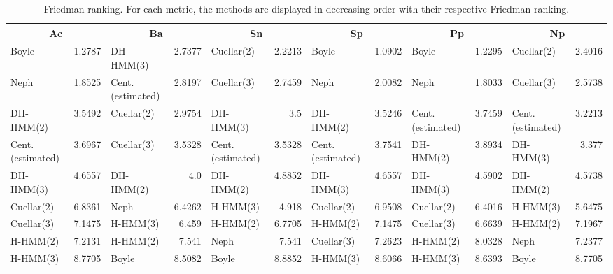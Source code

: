\documentclass[landscape, 8pt]{report}
\begin{document}
\begin{table}[h!]
\label{tab:ranking}
\vspace{0.0cm}
\begin{center}
\caption{Friedman ranking. For each metric, the methods are displayed in decreasing order with their respective Friedman ranking.}
\renewcommand{\arraystretch}{1.2}
  \begin{tabular}{ |lr|lr|lr|lr|lr|lr| }
    \hline
    \multicolumn{2}{|c|}{\textbf{Ac}} & \multicolumn{2}{|c|}{\textbf{Ba}} & \multicolumn{2}{|c|}{\textbf{Sn}} & \multicolumn{2}{|c|}{\textbf{Sp}} & \multicolumn{2}{|c|}{\textbf{Pp}} & \multicolumn{2}{|c|}{\textbf{Np}} \\
    \hline
    Boyle & 1.2787 &     DH-HMM(3) & 2.7377 &     Cuellar(2) & 2.2213 &     Boyle & 1.0902 &     Boyle & 1.2295 &     Cuellar(2) & 2.4016 \\
    Neph & 1.8525 &     Cent.(estimated) & 2.8197 &     Cuellar(3) & 2.7459 &     Neph & 2.0082 &     Neph & 1.8033 &     Cuellar(3) & 2.5738 \\
    DH-HMM(2) & 3.5492 &     Cuellar(2) & 2.9754 &     DH-HMM(3) & 3.5 &     DH-HMM(2) & 3.5246 &     Cent.(estimated) & 3.7459 &     Cent.(estimated) & 3.2213 \\
    Cent.(estimated) & 3.6967 &     Cuellar(3) & 3.5328 &     Cent.(estimated) & 3.5328 &     Cent.(estimated) & 3.7541 &     DH-HMM(2) & 3.8934 &     DH-HMM(3) & 3.377 \\
    DH-HMM(3) & 4.6557 &     DH-HMM(2) & 4.0 &     DH-HMM(2) & 4.8852 &     DH-HMM(3) & 4.6557 &     DH-HMM(3) & 4.5902 &     DH-HMM(2) & 4.5738 \\
    Cuellar(2) & 6.8361 &     Neph & 6.4262 &     H-HMM(3) & 4.918 &     Cuellar(2) & 6.9508 &     Cuellar(2) & 6.4016 &     H-HMM(3) & 5.6475 \\
    Cuellar(3) & 7.1475 &     H-HMM(3) & 6.459 &     H-HMM(2) & 6.7705 &     H-HMM(2) & 7.1475 &     Cuellar(3) & 6.6639 &     H-HMM(2) & 7.1967 \\
    H-HMM(2) & 7.2131 &     H-HMM(2) & 7.541 &     Neph & 7.541 &     Cuellar(3) & 7.2623 &     H-HMM(2) & 8.0328 &     Neph & 7.2377 \\
    H-HMM(3) & 8.7705 &     Boyle & 8.5082 &     Boyle & 8.8852 &     H-HMM(3) & 8.6066 &     H-HMM(3) & 8.6393 &     Boyle & 8.7705 \\
    \hline
  \end{tabular}
\end{center}
\vspace{0.0cm}
\end{table}
\end{document}
